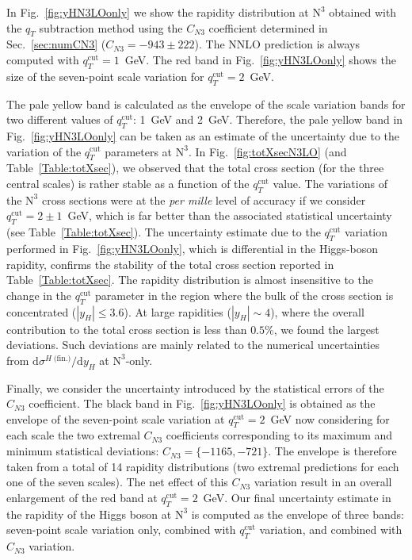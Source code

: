\documentclass[12pt]{article}
\DeclareRobustCommand{\qt}{\ensuremath{q_T}\xspace}
\DeclareRobustCommand{\qtcut}{\ensuremath{q_T^\mathrm{cut}}\xspace}
\DeclareRobustCommand{\rd}{\ensuremath{\mathrm{d}}}
\DeclareRobustCommand{\fin}{\text{(fin.)}\xspace}
\DeclareRobustCommand{\LO}{\text{LO}\xspace}
\DeclareRobustCommand{\N}[1]{\ensuremath{\text{N}^{#1}}} %
\begin{document}
In Fig.~\ref{fig:yHN3LOonly} we show the rapidity distribution at \N3\LO obtained with the $\qt$ subtraction method using the $C_{N3}$ coefficient determined in Sec.~\ref{sec:numCN3} ($C_{N3}=-943 \pm 222$). The NNLO prediction is always computed with $\qtcut=1$~GeV. 
The red band in Fig.~\ref{fig:yHN3LOonly} shows the size of the seven-point scale variation for $\qtcut=2$~GeV. 

The pale yellow band is calculated as the envelope of the scale variation bands for two different values of $\qtcut$: 1~GeV and 2~GeV. Therefore, the pale yellow band in Fig.~\ref{fig:yHN3LOonly} can be taken as an estimate of the uncertainty due to the variation of the $\qtcut$ parameters at \N3\LO. In Fig.~\ref{fig:totXsecN3LO} (and Table~\ref{Table:totXsec}), we observed that the total cross section (for the three central scales) is rather stable as a function of the $\qtcut$ value. The variations of the \N3\LO cross sections were at the \textit{per mille} level of accuracy if we consider  $\qtcut=2 \pm 1$~GeV, which is far better than the associated statistical uncertainty (see Table~\ref{Table:totXsec}). The uncertainty estimate due to the $\qtcut$ variation performed in Fig.~\ref{fig:yHN3LOonly}, which is differential in the Higgs-boson rapidity, confirms the stability of the total cross section reported in Table~\ref{Table:totXsec}. 
The rapidity distribution is almost insensitive to the change in the $\qtcut$ parameter in the region where the bulk of the cross section is concentrated ($|y_{H}| \leq 3.6$). At large rapidities ($|y_{H}| \sim 4$), where the overall contribution to the total cross section is less than $0.5\%$, we found the largest deviations. Such deviations are mainly related to the numerical uncertainties from $\rd\sigma^{H\;\fin}/\rd y_H$ at  \N3\LO-only.
 
Finally, we consider the uncertainty introduced by the statistical errors of the $C_{N3}$ coefficient. The black band in Fig.~\ref{fig:yHN3LOonly} is obtained as the envelope of the seven-point scale variation at $\qtcut=2$~GeV now considering for each scale the two extremal $C_{N3}$ coefficients corresponding to its maximum and minimum statistical deviations: $C_{N3} =\{-1165,-721\}$. The envelope is therefore taken from a total of 14 rapidity distributions (two extremal predictions for each one of the seven scales). The net effect of this $C_{N3}$ variation result in an overall enlargement of the red band at $\qtcut=2$~GeV. Our final uncertainty estimate in the rapidity of the Higgs boson at \N3\LO is computed as the envelope of three bands: seven-point scale variation only, combined with $\qtcut$ variation, and combined with $C_{N3}$ variation. 
\end{document}
